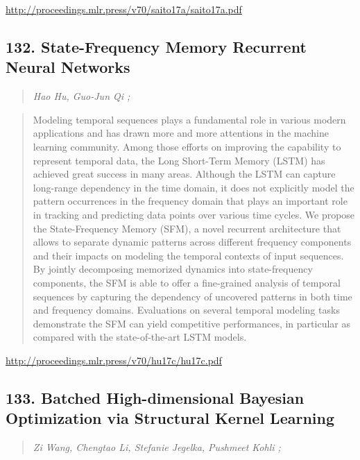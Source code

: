 \documentclass{article}
\begin{document}
\href{http://proceedings.mlr.press/v70/saito17a/saito17a.pdf}{http://proceedings.mlr.press/v70/saito17a/saito17a.pdf}

\subsection{132. State-Frequency Memory Recurrent Neural Networks}

\begin{quote}
\footnotesize{\textit{Hao Hu, Guo-Jun Qi ;}}
\end{quote}

\begin{quote}
    Modeling temporal sequences plays a fundamental role in various modern applications and has drawn more and more attentions in the machine learning community. Among those efforts on improving the capability to represent temporal data, the Long Short-Term Memory (LSTM) has achieved great success in many areas. Although the LSTM can capture long-range dependency in the time domain, it does not explicitly model the pattern occurrences in the frequency domain that plays an important role in tracking and predicting data points over various time cycles. We propose the State-Frequency Memory (SFM), a novel recurrent architecture that allows to separate dynamic patterns across different frequency components and their impacts on modeling the temporal contexts of input sequences. By jointly decomposing memorized dynamics into state-frequency components, the SFM is able to offer a fine-grained analysis of temporal sequences by capturing the dependency of uncovered patterns in both time and frequency domains. Evaluations on several temporal modeling tasks demonstrate the SFM can yield competitive performances, in particular as compared with the state-of-the-art LSTM models.  \end{quote}

\href{http://proceedings.mlr.press/v70/hu17c/hu17c.pdf}{http://proceedings.mlr.press/v70/hu17c/hu17c.pdf}

\subsection{133. Batched High-dimensional Bayesian Optimization via Structural Kernel Learning}

\begin{quote}
\footnotesize{\textit{Zi Wang, Chengtao Li, Stefanie Jegelka, Pushmeet Kohli ;}}
\end{quote}
\end{document}
